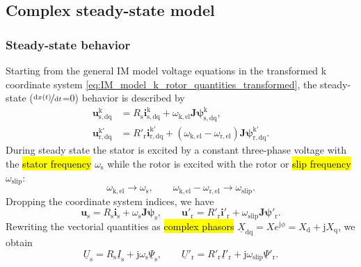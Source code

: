 \subsection{Complex steady-state model}

\begin{frame}
	\frametitle{Steady-state behavior}
	Starting from the general IM model voltage equations in the transformed k coordinate system \eqref{eq:IM_model_k_rotor_quantities_transformed}, the steady-state ($\nicefrac{\mathrm{d}x(t)}{\mathrm{d}t}$=0) behavior is described by
	\begin{equation}
		\begin{alignedat}{2}
			\bm{u}^\mathrm{k}_\mathrm{s,dq}  & = R_\mathrm{s} \bm{i}^\mathrm{k}_\mathrm{s,dq} + \omega_\mathrm{k,el}\bm{J} \bm{\psi}^\mathrm{k}_\mathrm{s,dq},                                    \\
			\bm{u}^\mathrm{k'}_\mathrm{r,dq} & = R'_\mathrm{r} \bm{i}^\mathrm{k'}_\mathrm{r,dq} +\left(\omega_\mathrm{k,el}-\omega_\mathrm{r,el}\right)\bm{J}\bm{\psi}^\mathrm{k'}_\mathrm{r,dq}.
		\end{alignedat}
	\end{equation}
	\pause
	During steady state the stator is excited by a constant three-phase voltage with the \hl{stator frequency} $\omega_\mathrm{s}$ while the rotor is excited with the rotor  or \hl{slip frequency} $\omega_\mathrm{slip}$:
	\begin{equation}
		\omega_\mathrm{k,el} \rightarrow \omega_\mathrm{s}, \qquad \omega_\mathrm{k,el}-\omega_\mathrm{r,el} \rightarrow \omega_\mathrm{slip}.
	\end{equation}
	\pause Dropping the coordinate system indices, we have
	\begin{equation}
		\bm{u}_\mathrm{s} = R_\mathrm{s} \bm{i}_\mathrm{s} + \omega_\mathrm{s}\bm{J} \bm{\psi}_\mathrm{s},\qquad
		\bm{u}'_\mathrm{r} = R'_\mathrm{r} \bm{i}'_\mathrm{r} +\omega_\mathrm{slip}\bm{J}\bm{\psi}'_\mathrm{r}.
	\end{equation}
	\pause
	Rewriting the vectorial quantities as \hl{complex phasors} $\underline{X}_\mathrm{dq} = X e^{\mathrm{j}\phi}=X_\mathrm{d} + \mathrm{j} X_\mathrm{q}$, we obtain
	\begin{equation}
		\underline{U}_\mathrm{s} = R_\mathrm{s} \underline{I}_\mathrm{s} + \mathrm{j}\omega_\mathrm{s}\underline{\Psi}_\mathrm{s},\qquad
		\underline{U}'_\mathrm{r} = R'_\mathrm{r} \underline{I}'_\mathrm{r} +\mathrm{j}\omega_\mathrm{slip}\underline{\Psi}'_\mathrm{r}.
		\label{eq:IM_model_voltage_equations_steady_state}
	\end{equation}
\end{frame}

